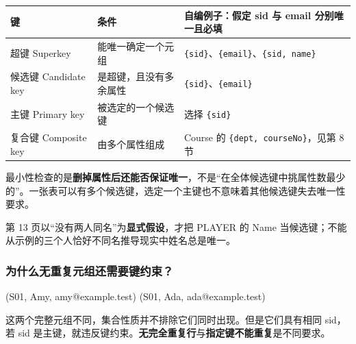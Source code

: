 \begin{longtable}[]{@{}
  >{\raggedright\arraybackslash}p{}
  >{\raggedright\arraybackslash}p{}
  >{\raggedright\arraybackslash}p{}@{}}
\toprule\noalign{}
\begin{minipage}[b]{\linewidth}\raggedright
键
\end{minipage} & \begin{minipage}[b]{\linewidth}\raggedright
条件
\end{minipage} & \begin{minipage}[b]{\linewidth}\raggedright
自编例子：假定 sid 与 email 分别唯一且必填
\end{minipage} \\
\midrule\noalign{}
\endhead
\bottomrule\noalign{}
\endlastfoot
超键 Superkey & 能唯一确定一个元组 & \texttt{\{sid\}}、\texttt{\{email\}}、\texttt{\{sid,\ name\}} \\
候选键 Candidate key & 是超键，且没有多余属性 & \texttt{\{sid\}}、\texttt{\{email\}} \\
主键 Primary key & 被选定的一个候选键 & 选择 \texttt{\{sid\}} \\
复合键 Composite key & 由多个属性组成 & Course 的 \texttt{\{dept,\ courseNo\}}，见第 8 节 \\
\end{longtable}

最小性检查的是\textbf{删掉属性后还能否保证唯一}，不是``在全体候选键中挑属性数最少的''。一张表可以有多个候选键，选定一个主键也不意味着其他候选键失去唯一性要求。

第 13 页以``没有两人同名''为\textbf{显式假设}，才把 PLAYER 的 Name 当候选键；不能从示例的三个人恰好不同名推导现实中姓名总是唯一。

\subsubsection{为什么无重复元组还需要键约束？}\label{03_relational_model_and_integrity_zh-ux4e3aux4ec0ux4e48ux65e0ux91cdux590dux5143ux7ec4ux8fd8ux9700ux8981ux952eux7ea6ux675f}

\begin{StudyCode}
(S01, Amy, amy@example.test)
(S01, Ada, ada@example.test)
\end{StudyCode}

这两个完整元组不同，集合性质并不排除它们同时出现。但是它们具有相同 sid，若 sid 是主键，就违反键约束。\textbf{无完全重复行}与\textbf{指定键不能重复}是不同要求。

